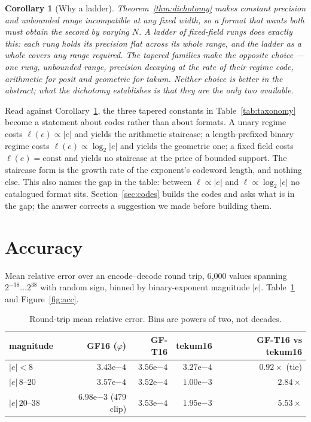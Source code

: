 \documentclass[11pt]{article}
\newtheorem{corollary}{Corollary}
\theoremstyle{definition}
\begin{document}
\begin{corollary}[Why a ladder]
\label{cor:ladder}
Theorem~\ref{thm:dichotomy} makes constant precision and unbounded range
incompatible at any fixed width, so a format that wants both must obtain the
second by varying $N$. A ladder of fixed-field rungs does exactly this: each rung
holds its precision flat across its whole range, and the ladder as a whole covers
any range required. The tapered families make the opposite choice --- one rung,
unbounded range, precision decaying at the rate of their regime code, arithmetic
for posit and geometric for takum. Neither choice is better in the abstract; what
the dichotomy establishes is that they are the only two available.
\end{corollary}

Read against Corollary~\ref{cor:ladder}, the three tapered constants in
Table~\ref{tab:taxonomy} become a statement about codes rather than about
formats. A unary regime costs $\ell(e) \propto |e|$ and yields the arithmetic
staircase; a length-prefixed binary regime costs $\ell(e) \propto \log_2 |e|$ and
yields the geometric one; a fixed field costs $\ell(e) = \mathrm{const}$ and
yields no staircase at the price of bounded support. The staircase form is the
growth rate of the exponent's codeword length, and nothing else. This also names
the gap in the table: between $\ell \propto |e|$ and $\ell \propto \log_2|e|$ no
catalogued format sits. Section~\ref{sec:codes} builds the codes and asks what is
in the gap; the answer corrects a suggestion we made before building them.

\section{Accuracy}\label{sec:accuracy}

Mean relative error over an encode--decode round trip, 6{,}000 values spanning
$2^{-38}\ldots2^{38}$ with random sign, binned by binary-exponent magnitude
$|e|$. Table~\ref{tab:acc} and Figure~\ref{fig:acc}.

\begin{table}[t]\centering
\caption{Round-trip mean relative error. Bins are powers of two, not decades.}
\label{tab:acc}
\begin{tabular}{lrrrr}
\toprule
magnitude & GF16 ($\varphi$) & \textbf{GF-T16} & tekum16 & GF-T16 vs tekum16 \\
\midrule
$|e|<8$        & $3.43\mathrm{e}{-4}$              & $3.56\mathrm{e}{-4}$ & $3.27\mathrm{e}{-4}$ & $0.92\times$ (tie) \\
$|e|\,8$--$20$   & $3.57\mathrm{e}{-4}$              & $3.52\mathrm{e}{-4}$ & $1.00\mathrm{e}{-3}$ & $\mathbf{2.84\times}$ \\
$|e|\,20$--$38$  & $6.98\mathrm{e}{-3}$ (479 clip)   & $3.53\mathrm{e}{-4}$ & $1.95\mathrm{e}{-3}$ & $\mathbf{5.53\times}$ \\
\bottomrule
\end{tabular}
\end{table}
\end{document}
